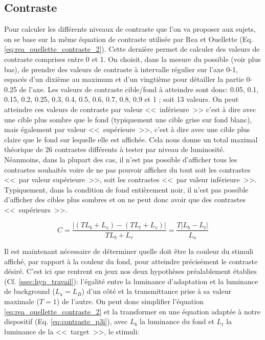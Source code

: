 	\subsection{Contraste}
	\label{ssec:contraste}
	\par Pour calculer les différents niveaux de contraste que l'on va proposer aux sujets, on se base sur la même équation de contraste utilisée par Rea et Ouellette (Eq. \ref{eq:rea_ouellette_contraste_2}). Cette dernière permet de calculer des valeurs de contraste comprises entre 0 et 1. On choisit, dans la mesure du possible (voir plus bas), de prendre des valeurs de contraste à intervalle régulier sur l'axe 0-1, espacés d'un dixième au maximum et d'un vingtième pour détailler la partie 0-0.25 de l'axe. Les valeurs de contraste cible/fond à atteindre sont donc: 0.05, 0.1, 0.15, 0.2, 0.25, 0.3, 0.4, 0.5, 0.6, 0.7, 0.8, 0.9 et 1 ; soit 13 valeurs. On peut atteindre ces valeurs de contraste par valeur <<~inférieure~>> c'est à dire avec une cible plus sombre que le fond (typiquement une cible grise sur fond blanc), mais également par valeur <<~supérieure~>>, c'est à dire avec une cible plus claire que le fond sur lequelle elle est affichée. Cela nous donne un total maximal théorique de 26 contrastes différents à tester par niveau de luminosité. Néanmoins, dans la plupart des cas, il n'est pas possible d'afficher tous les contrastes souhaités voire de ne pas pouvoir afficher du tout soit les contrastes <<~par valeur supérieure~>>, soit les contrastes <<~par valeur inférieure~>>. Typiquement, dans la condition de fond entièrement noir, il n'est pas possible d'afficher des cibles plus sombres et on ne peut donc avoir que des contrastes <<~supérieurs~>>.
	
	\begin{equation}
		C = \frac{\vert (T L_b + L_v) - (T L_t + L_v) \vert}{T L_b + L_v} = \frac{T \vert L_b - L_t \vert}{L_a}
		\label{eq:rea_ouellette_contraste_2}
	\end{equation}
	
	\par Il est maintenant nécessaire de déterminer quelle doit être la couleur du stimuli affiché, par rapport à la couleur du fond, pour atteindre précisément le contraste désiré. C'est ici que rentrent en jeux nos deux hypothèses préalablement établies (Cf. \ref{ssec:hyp_travail}): l'égalité entre la luminance d'adaptation et la luminance de background ($L_a = L_B$) d'un côté et la transmittance prise à sa valeur maximale ($T = 1$) de l'autre. On peut donc simplifier l'équation \ref{eq:rea_ouellette_contraste_2} et la transformer en une équation adaptée à notre dispositif (Eq. \ref{eq:contraste_p3i}), avec $L_b$ la luminance du fond et $L_t$ la luminance de la <<~target~>>, le stimuli:
	
